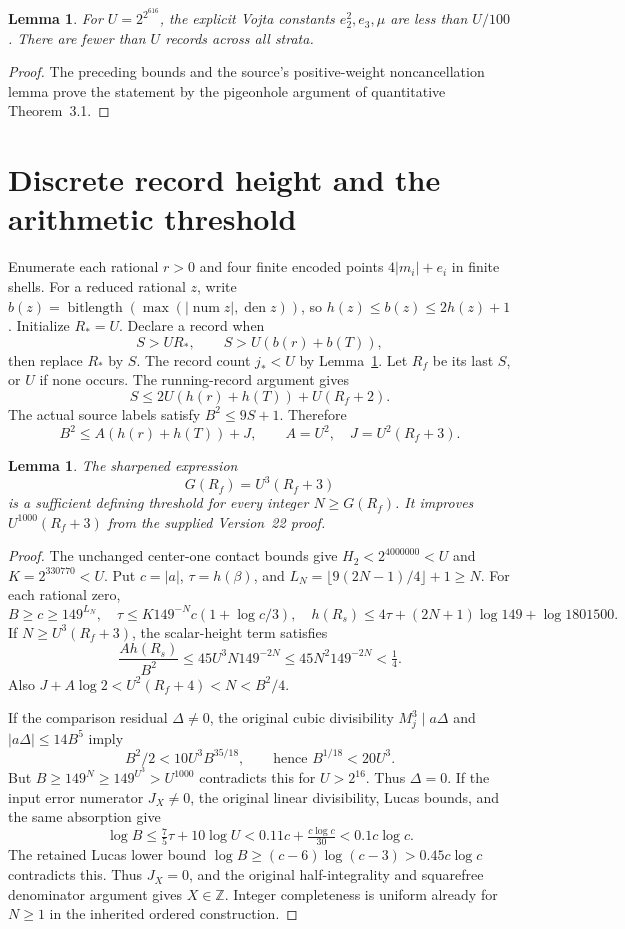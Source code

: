 \documentclass[11pt]{article}
\newtheorem{lemma}[theorem]{Lemma}
\newcommand{\Z}{\mathbb Z}
\begin{document}
\begin{lemma}\label{lem:U}
For \(U=2^{2^{616}}\), the explicit Vojta constants
\(e_2^2,e_3,\mu\) are less than \(U/100\).
There are fewer than \(U\) records across all strata.
\end{lemma}
\begin{proof}
The preceding bounds and the source's positive-weight
noncancellation lemma prove the statement by the
pigeonhole argument of quantitative Theorem~3.1.
\end{proof}

\section{Discrete record height and the arithmetic threshold}
Enumerate each rational \(r>0\) and four finite encoded points
\(4|m_i|+e_i\) in finite shells.
For a reduced rational \(z\), write
\(b(z)=\operatorname{bitlength}(\max(|\operatorname{num}z|,
\operatorname{den}z))\), so \(h(z)\le b(z)\le2h(z)+1\).
Initialize \(R_*=U\).
Declare a record when
\[
S>UR_*,\qquad S>U(b(r)+b(T)),
\]
then replace \(R_*\) by \(S\).
The record count \(j_*<U\) by Lemma~\ref{lem:U}.
Let \(R_f\) be its last \(S\), or \(U\) if none occurs.
The running-record argument gives
\[
S\le2U(h(r)+h(T))+U(R_f+2).
\]
The actual source labels satisfy \(B^2\le9S+1\).
Therefore
\[
B^2\le A(h(r)+h(T))+J,\qquad
A=U^2,\quad J=U^2(R_f+3).
\]

\begin{lemma}\label{lem:threshold}
The sharpened expression
\[
G(R_f)=U^3(R_f+3)
\]
is a sufficient defining threshold for every integer
\(N\ge G(R_f)\). It improves \(U^{1000}(R_f+3)\)
from the supplied Version~22 proof.
\end{lemma}
\begin{proof}
The unchanged center-one contact bounds give
\(H_2<2^{4000000}<U\) and \(K=2^{330770}<U\).
Put \(c=|a|\), \(\tau=h(\beta)\), and
\(L_N=\lfloor9(2N-1)/4\rfloor+1\ge N\).
For each rational zero,
\[
B\ge c\ge149^{L_N},\quad
\tau\le K149^{-N}c(1+\log c/3),\quad
h(R_s)\le4\tau+(2N+1)\log149+\log1801500.
\]
If \(N\ge U^3(R_f+3)\), the scalar-height term satisfies
\[
\frac{Ah(R_s)}{B^2}
\le45U^3N149^{-2N}
\le45N^2 149^{-2N}
<\tfrac14.
\]
Also \(J+A\log2<U^2(R_f+4)<N<B^2/4\).

If the comparison residual \(\Delta\ne0\),
the original cubic divisibility \(M_j^3\mid a\Delta\)
and \(|a\Delta|\le14B^5\) imply
\[
B^2/2<10U^3B^{35/18},
\qquad\text{hence }B^{1/18}<20U^3.
\]
But \(B\ge149^N\ge149^{U^3}>U^{1000}\)
contradicts this for \(U>2^{16}\).
Thus \(\Delta=0\).
If the input error numerator \(J_X\ne0\), the original
linear divisibility, Lucas bounds, and the same absorption give
\[
\log B\le\tfrac75\tau+10\log U
<0.11c+\tfrac{c\log c}{30}
<0.1c\log c.
\]
The retained Lucas lower bound
\(\log B\ge(c-6)\log(c-3)>0.45c\log c\)
contradicts this. Thus \(J_X=0\), and
the original half-integrality and squarefree denominator argument
gives \(X\in\Z\).
Integer completeness is uniform already for \(N\ge1\)
in the inherited ordered construction.
\end{proof}
\end{document}
